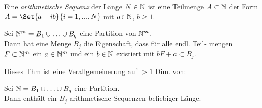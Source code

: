 \documentclass{cheat-sheet}
\begin{document}

\begin{defn}
  Eine \emph{arithmetische Sequenz} der Länge $N \in \mathbb{N}$ ist eine Teilmenge $A \subset \mathbb{N}$ der Form $A = \Set{a + ib}{i = 1, \nldots, N}$ mit $a \!\in\! \mathbb{N}$, $b \!\geq\! 1$.
\end{defn}

\begin{thm}
  Sei $\mathbb{N}^m = B_1 \cup \ldots \cup B_q$ eine Partition von $\mathbb{N}^m$. \\
  Dann hat eine Menge $B_j$ die Eigenschaft, dass für alle endl. Teil- mengen $F \subset \mathbb{N}^m$ ein $a \in \mathbb{N}^m$ und ein $b \in \mathbb{N}$ existiert mit $bF + a \subset B_j$.
\end{thm}

\begin{bem}
  Dieses Thm ist eine Verallgemeinerung auf $>\!1$ Dim. von:
\end{bem}

\begin{thm}
  Sei $\mathbb{N} = B_1 \cup \ldots \cup B_q$ eine Partition. \\
  Dann enthält ein $B_j$ arithmetische Sequenzen beliebiger Länge.
\end{thm}
\end{document}
